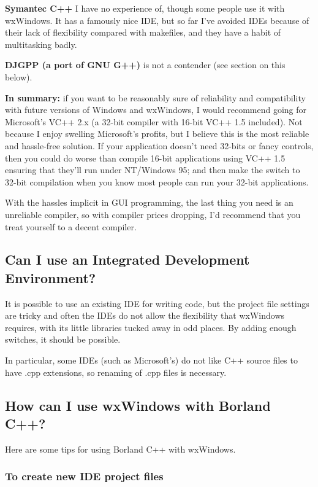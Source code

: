 {\bf Symantec C++} I have no experience of, though some people use it with
wxWindows. It has a famously nice IDE, but so far I've avoided IDEs because
of their lack of flexibility compared with makefiles, and they have a habit
of multitasking badly.

{\bf DJGPP (a port of GNU G++)} is not a contender (see section on this below).

{\bf In summary:} if you want to be reasonably sure of reliability and
compatibility with future versions of Windows and wxWindows, I would
recommend going for Microsoft's VC++ 2.x (a 32-bit compiler with 16-bit
VC++ 1.5 included). Not because I enjoy swelling Microsoft's profits, but
I believe this is the most reliable and hassle-free solution. If your
application doesn't need 32-bits or fancy controls, then you could
do worse than compile 16-bit applications using VC++ 1.5 ensuring that
they'll run under NT/Windows 95; and then make the switch to 32-bit
compilation when you know most people can run your 32-bit applications.

With the hassles implicit in GUI programming, the last thing you need is
an unreliable compiler, so with compiler prices dropping, I'd recommend
that you treat yourself to a decent compiler.

\subsection{Can I use an Integrated Development Environment?}\label{ide}

It is possible to use an existing IDE for writing code, but the
project file settings are tricky and often the IDEs do not allow
the flexibility that wxWindows requires, with its little libraries
tucked away in odd places. By adding enough switches, it should be
possible.

In particular, some IDEs (such as Microsoft's) do not like C++ source
files to have .cpp extensions, so renaming of .cpp files is necessary.


\subsection{How can I use wxWindows with Borland C++?}

Here are some tips for using Borland C++ with wxWindows.

\subsubsection{To create new IDE project files}

